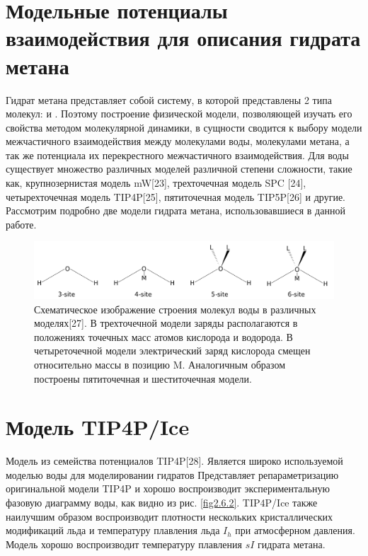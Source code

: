 \section{Модельные потенциалы взаимодействия для описания гидрата метана}
Гидрат метана представляет собой систему, в которой представлены 2 типа молекул:  и . Поэтому построение физической модели, позволяющей изучать его свойства методом молекулярной динамики, в сущности сводится к выбору модели межчастичного взаимодействия между молекулами воды, молекулами метана, а так же потенциала их перекрестного межчастичного взаимодействия. Для воды существует множество различных моделей различной степени сложности, такие как, крупнозернистая модель mW[23], трехточечная модель SPC [24], четырехточечная модель TIP4P[25], пятиточечная модель TIP5P[26] и другие. Рассмотрим подробно две модели гидрата метана, использовавшиеся в данной работе. 
\begin{figure}[H]
    \centering
    \includegraphics[width=.9\linewidth]{figures/watermodels.png}
    \caption{Схематическое изображение строения молекул воды в различных моделях[27]. В трехточечной модели заряды располагаются в положениях точечных масс атомов кислорода и водорода. В четыреточечной модели электрический заряд кислорода смещен относительно массы в позицию M. Аналогичным образом построены пятиточечная и шеститочечная модели.}
    \label{fig2.6.1}
\end{figure}

\section{Модель TIP4P/Ice}
Модель из семейства потенциалов TIP4P[28]. Является широко используемой моделью воды для моделировании гидратов Представляет репараметризацию оригинальной модели TIP4P и хорошо воспроизводит экспериментальную фазовую диаграмму воды, как видно из рис. \ref{fig2.6.2}. TIP4P/Ice также наилучшим образом воспроизводит плотности нескольких кристаллических модификаций льда и температуру плавления льда $I_h$ при атмосферном давления. Модель хорошо воспроизводит температуру плавления $sI$ гидрата метана.


